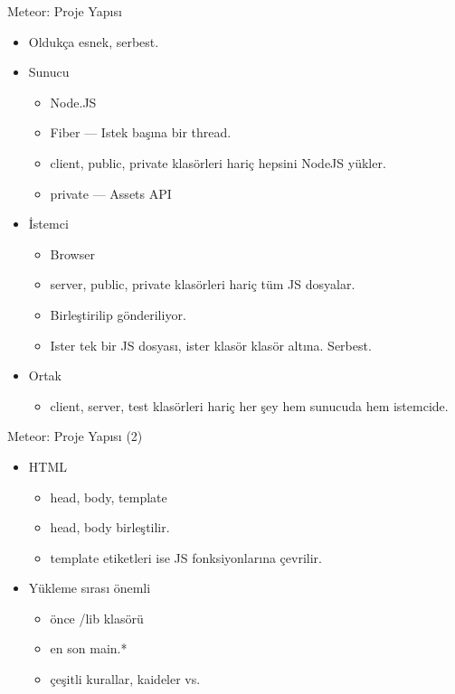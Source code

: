 \documentclass{beamer}
\begin{document}
    \begin{frame}{Meteor: Proje Yap{\i}s{\i}}
        \begin{itemize}
            \item Oldukça esnek, serbest.
            \item Sunucu
                \begin{itemize}
                    \item Node.JS 
                    \item Fiber --- Istek başına bir thread.
                    \item client, public, private klasörleri hariç hepsini NodeJS yükler.
                    \item private --- Assets API
                \end{itemize}
            \item İstemci
                \begin{itemize}
                    \item Browser
                    \item server, public, private klasörleri hariç tüm JS dosyalar.
                    \item Birleştirilip gönderiliyor.
                    \item Ister tek bir JS dosyası, ister klasör klasör altına. Serbest.
                \end{itemize}
            \item Ortak
                \begin{itemize}
                    \item client, server, test klasörleri hariç her şey hem sunucuda hem istemcide.
                \end{itemize}
        \end{itemize}
    \end{frame}

    \begin{frame}{Meteor: Proje Yapısı (2)}
        \begin{itemize}
            \item HTML
                \begin{itemize}
                    \item head, body, template
                    \item head, body birleştilir.
                    \item template etiketleri ise JS fonksiyonlarına çevrilir.
                \end{itemize}
            \item Yükleme sırası önemli
                \begin{itemize}
                    \item önce /lib klasörü
                    \item en son main.* 
                    \item çeşitli kurallar, kaideler vs.
                \end{itemize}
        \end{itemize}
    \end{frame}
\end{document}
